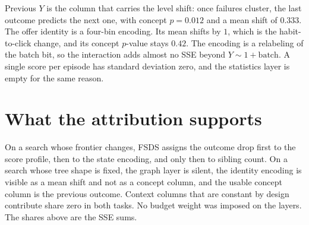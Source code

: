 \documentclass[11pt,a4paper]{article}
\begin{document}
Previous \(Y\) is the column that carries the level shift: once failures cluster, the last outcome predicts the next one, with concept \(p=0.012\) and a mean shift of \(0.333\).
The offer identity is a four-bin encoding. Its mean shifts by \(1\), which is the habit-to-click change, and its concept \(p\)-value stays \(0.42\).
The encoding is a relabeling of the batch bit, so the interaction adds almost no SSE beyond \(Y\sim 1+\mathrm{batch}\).
A single score per episode has standard deviation zero, and the statistics layer is empty for the same reason.

\section{What the attribution supports}
On a search whose frontier changes, FSDS assigns the outcome drop first to the score profile, then to the state encoding, and only then to sibling count.
On a search whose tree shape is fixed, the graph layer is silent, the identity encoding is visible as a mean shift and not as a concept column, and the usable concept column is the previous outcome.
Context columns that are constant by design contribute share zero in both tasks.
No budget weight was imposed on the layers. The shares above are the SSE sums.
\end{document}
